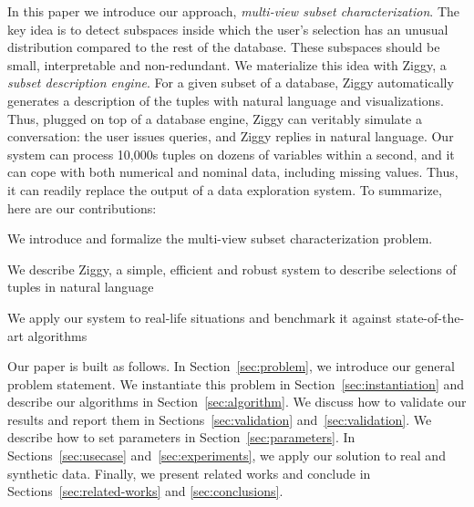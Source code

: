 In this paper we introduce our approach, \emph{multi-view subset
characterization}. The key idea is to detect subspaces inside which the user's
selection has an unusual distribution compared to the rest of the database.
These subspaces should be small, interpretable and non-redundant.  We
materialize this idea with Ziggy, a \emph{subset description engine}. For a
given subset of a database, Ziggy automatically generates a description of the
tuples with natural language and visualizations.  Thus, plugged on top of a
database engine, Ziggy can veritably simulate a conversation: the
user issues queries, and Ziggy replies in natural language. Our system can
process 10,000s tuples on dozens of variables within a second, and it can cope with
both numerical and nominal data, including missing values.  Thus, it can
readily replace the output of a data exploration system. To summarize, here are
our contributions: \begin{itemize0}
    \item We introduce and formalize the multi-view subset characterization problem.
    \item We describe Ziggy, a simple, efficient and robust system to describe
        selections of tuples in natural language
    \item We apply our system to real-life situations and benchmark it against
        state-of-the-art algorithms
\end{itemize0}

Our paper is built as follows. In Section~\ref{sec:problem}, we introduce our
general problem statement. We instantiate this problem in
Section~\ref{sec:instantiation} and describe our algorithms in
Section~\ref{sec:algorithm}. We discuss how to validate our results and
report them in Sections~\ref{sec:validation} and~\ref{sec:validation}. We
describe how to set parameters in Section~\ref{sec:parameters}. In
Sections~\ref{sec:usecase} and~\ref{sec:experiments}, we apply our solution to
real and synthetic data. Finally, we present related works and conclude in
Sections~\ref{sec:related-works} and \ref{sec:conclusions}.


